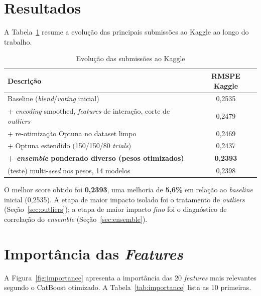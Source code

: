 \documentclass[12pt, a4paper]{article}
\begin{document}
\section{Resultados}

A Tabela~\ref{tab:submissoes} resume a evolução das principais submissões ao Kaggle ao longo do trabalho.

\begin{table}[H]
  \centering
  \caption{Evolução das submissões ao Kaggle}
  \label{tab:submissoes}
  \small{}
  \begin{tabular}{p{8.5cm}c}
    \toprule
    \rowcolor{headerblue}
    \color{white}\textbf{Descrição} & \color{white}\textbf{RMSPE Kaggle} \\
    \midrule
    Baseline (\textit{blend}/\textit{voting} inicial)                     & 0,2535 \\
    + \textit{encoding} smoothed, \textit{features} de interação, corte de \textit{outliers} & 0,2479 \\
    + re-otimização Optuna no dataset limpo                                & 0,2469 \\
    + Optuna estendido (150/150/80 \textit{trials})                       & 0,2437 \\
    \textbf{+ \textit{ensemble} ponderado diverso (pesos otimizados)}     & \textbf{0,2393} \\
    \midrule
    (teste) multi-\textit{seed} nos pesos, 14 modelos                     & 0,2398 \\
    \bottomrule
  \end{tabular}
\end{table}

O melhor score obtido foi \textbf{0,2393}, uma melhoria de \textbf{5,6\%} em relação ao \textit{baseline} inicial (0,2535). A etapa de maior impacto isolado foi o tratamento de \textit{outliers} (Seção~\ref{sec:outliers}); a etapa de maior impacto \textit{fino} foi o diagnóstico de correlação do \textit{ensemble} (Seção~\ref{sec:ensemble}).

\section{Importância das \textit{Features}}

A Figura~\ref{fig:importance} apresenta a importância das 20 \textit{features} mais relevantes segundo o CatBoost otimizado. A Tabela~\ref{tab:importance} lista as 10 primeiras.
\end{document}
